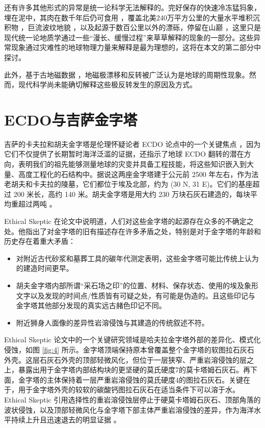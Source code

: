 \documentclass[10pt,twocolumn,letterpaper]{article}
\begin{document}
还有许多其他形式的异常是统一论科学无法解释的。完好保存的快速冷冻猛犸象，埋在泥中，其肉在数千年后仍可食用 \cite{17,18,19}，覆盖北美240万平方公里的大量水平堆积沉积物 \cite{21}，巨流波纹地貌 \cite{22}，以及起源于数百公里以外的漂砾，停留在山巅 \cite{23,26}，这里只是现代统一论地质学通过一些“漫长、缓慢过程”来草草解释的现象的一部分。这些异常现象通过灾难性的地球物理力量来解释是最为理想的，这将在本文的第二部分中探讨。

此外，基于古地磁数据 \cite{35,40,41}，地磁极漂移和反转被广泛认为是地球的周期性现象。然而，现代科学尚未能确切解释这些极反转发生的原因及方式。

\section{ECDO与吉萨金字塔}

吉萨的卡夫拉和胡夫金字塔是伦理怀疑论者 ECDO 论点中的一个关键焦点 \cite{27}，因为它们不仅提供了长期暂时海洋泛滥的证据，还指示了地球 ECDO 翻转的潜在方向，表明我们的祖先能够测量地球的灾变并具备工程技能，将这些知识嵌入到大量、高度工程化的石结构中。据说这两座金字塔建于公元前 2500 年左右，作为法老胡夫和卡夫拉的陵墓，它们都位于埃及北部，约为 (30 N, 31 E)。它们的基座超过 200 米长，高约 140 米。胡夫金字塔是用大约 230 万块石灰石建造的，每块平均重超过两吨 \cite{24, 25}。

Ethical Skeptic 在论文中说明道，人们对这些金字塔的起源存在众多的不确定之处。他指出了对金字塔的旧有描述存在许多矛盾之处，特别是对于金字塔的年龄和历史存在着重大矛盾：

\begin{flushleft}
\begin{itemize}
    \item 对附近古代砂浆和墓葬工具的碳年代测定表明，这些金字塔可能比传统上认为的建造时间更早。
    \item 胡夫金字塔内部所谓“采石场之印”的位置、材料、保存状态、使用的埃及象形文字以及发现的时间点/性质皆有可疑之处，有可能是伪造的。且这些印记与金字塔其他部分发现的真实远古赭色印记不同。
    \item 附近狮身人面像的差异性岩溶侵蚀与其建造的传统叙述不符。
\end{itemize}
\end{flushleft}


Ethical Skeptic 论文中的一个关键研究领域是哈夫拉金字塔外部的差异化、模式化侵蚀，如图 \ref{fig:4} 所示。金字塔顶端保持原本曾覆盖整个金字塔的软图拉石灰石外壳。这层石灰石外壳的顶部轻微风化，但位于一层狭窄、严重岩溶侵蚀的层之上，暴露出用于金字塔内部结构块的更坚硬的莫氏硬度7的莫卡塔姆石灰石。再下面，金字塔的主体保持着一层严重岩溶侵蚀的莫氏硬度4的图拉石灰石。关键在于，用于金字塔外壳的较软的碳酸钙图拉石灰石在适当条件下可以溶于水。Ethical Skeptic 引用选择性的重岩溶侵蚀层停止于硬莫卡塔姆石灰石、顶部角落的波状侵蚀，以及顶部轻微风化与金字塔下部主体严重岩溶侵蚀的差异，作为海洋水平持续上升且迅速退去的明显证据 \cite{27}。
\end{document}
